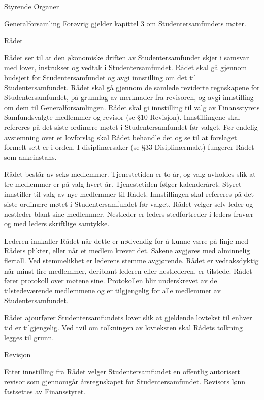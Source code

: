 \begin{lovkapittel}{Styrende Organer}
\begin{lovparagraf}{Generalforsamling}
Forøvrig gjelder kapittel 3 om Studentersamfundets møter.

    \end{lovparagraf}
    
    \begin{lovparagraf}{Rådet}
    
Rådet ser til at den økonomiske driften av Studentersamfundet skjer i samsvar med lover, instrukser og vedtak i
Studentersamfundet. Rådet skal gå gjennom budsjett for Studentersamfundet og avgi innstilling om det til
Studentersamfundet. Rådet skal gå gjennom de samlede reviderte regnskapene for Studentersamfundet, på grunnlag
av merknader fra revisoren, og avgi innstilling om dem til Generalforsamlingen. Rådet skal gi innstilling til valg av
Finansstyrets Samfundsvalgte medlemmer og revisor (se §10 Revisjon). Innstillingene skal refereres på det siste
ordinære møtet i Studentersamfundet før valget. Før endelig avstemning over et lovforslag skal Rådet behandle det og
se til at forslaget formelt sett er i orden. I disiplinærsaker (se §33 Disiplinærmakt) fungerer Rådet som ankeinstans.

Rådet består av seks medlemmer. Tjenestetiden er to år, og valg avholdes slik at tre medlemmer er på valg hvert år.
Tjenestetiden følger kalenderåret. Styret innstiller til valg av nye medlemmer til Rådet. Innstillingen skal refereres på
det siste ordinære møtet i Studentersamfundet før valget. Rådet velger selv leder og nestleder blant sine medlemmer.
Nestleder er leders stedfortreder i leders fravær og med leders skriftlige samtykke.

Lederen innkaller Rådet når dette er nødvendig for å kunne være på linje med Rådets plikter, eller når et medlem
krever det. Sakene avgjøres med alminnelig flertall. Ved stemmelikhet er lederens stemme avgjørende. Rådet er
vedtaksdyktig når minst fire medlemmer, deriblant lederen eller nestlederen, er tilstede. Rådet fører protokoll over
møtene sine. Protokollen blir underskrevet av de tilstedeværende medlemmene og er tilgjengelig for alle medlemmer
av Studentersamfundet.

Rådet ajourfører Studentersamfundets lover slik at gjeldende lovtekst til enhver tid er tilgjengelig. Ved tvil om
tolkningen av lovteksten skal Rådets tolkning legges til grunn.

  \end{lovparagraf}
  
  \begin{lovparagraf}{Revisjon}
  
Etter innstilling fra Rådet velger Studentersamfundet en offentlig autorisert revisor som gjennomgår årsregnskapet for
Studentersamfundet. Revisors lønn fastsettes av Finansstyret.

  \end{lovparagraf}
  
\end{lovkapittel}





